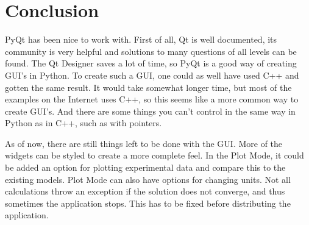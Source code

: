 \section{Conclusion}
PyQt has been nice to work with. First of all, Qt is well documented, its community is very helpful and solutions to many questions of all levels can be found. The Qt Designer saves a lot of time, so PyQt is a good way of creating GUI's in Python. To create such a GUI, one could as well have used C++ and gotten the same result. It would take somewhat longer time, but most of the examples on the Internet uses C++, so this seems like a more common way to create GUI's. And there are some things you can't control in the same way in Python as in C++, such as with pointers.

As of now, there are still things left to be done with the GUI. More of the widgets can be styled to create a more complete feel. In the Plot Mode, it could be added an option for plotting experimental data and compare this to the existing models. Plot Mode can also have options for changing units. Not all calculations throw an exception if the solution does not converge, and thus sometimes the application stops. This has to be fixed before distributing the application.